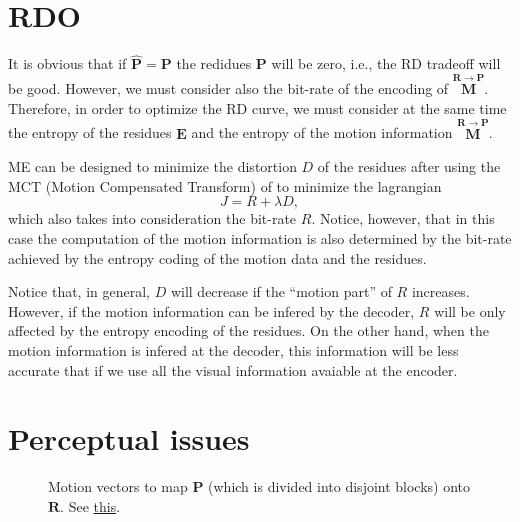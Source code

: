 
\section{RDO}

It is obvious that if $\hat{{\mathbf P}}={\mathbf P}$ the redidues
${\mathbf P}$ will be zero, i.e., the RD tradeoff will be
good. However, we must consider also the bit-rate of the encoding of
$\overset{{\mathbf R}\rightarrow {\mathbf P}}{\mathbf M}$. Therefore,
in order to optimize the RD curve, we must consider at the same time
the entropy of the residues ${\mathbf E}$ and the entropy of the
motion information $\overset{{\mathbf R}\rightarrow {\mathbf
    P}}{\mathbf M}$.

ME can be designed to minimize the distortion $D$ of the residues
after using the MCT (Motion Compensated Transform) of to minimize the
lagrangian
\begin{equation}
  J = R + \lambda D,
\end{equation}
which also takes into consideration the bit-rate $R$. Notice, however,
that in this case the computation of the motion information is also
determined by the bit-rate achieved by the entropy coding of the
motion data and the residues.

Notice that, in general, $D$ will decrease if the ``motion part'' of
$R$ increases. However, if the motion information can be infered by
the decoder, $R$ will be only affected by the entropy encoding of the
residues. On the other hand, when the motion information is infered at
the decoder, this information will be less accurate that if we use all
the visual information avaiable at the encoder.


\section{Perceptual issues}

\begin{figure}
  \centering
  \caption{Motion vectors to map ${\mathbf P}$ (which is divided into
    disjoint blocks) onto ${\mathbf R}$. See
    \href{https://github.com/Sistemas-Multimedia/Sistemas-Multimedia.github.io/blob/master/milestones/09-ME/full_search_block_ME.ipynb}{this}.}
  \label{fig:MVs_block}
\end{figure}

